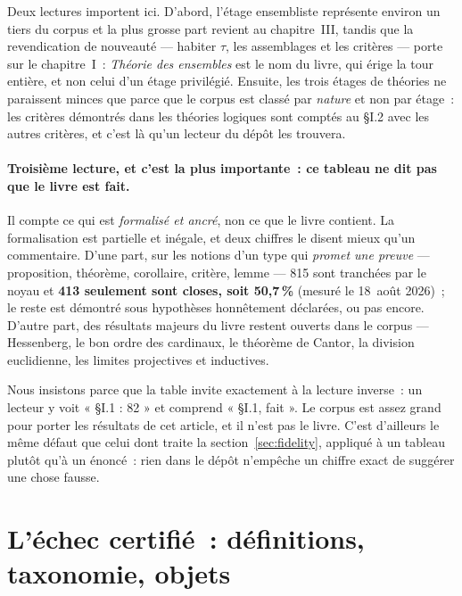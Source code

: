 \documentclass[11pt]{article}
\theoremstyle{remark}\newtheorem{example}{Exemple}
\begin{document}
Deux lectures importent ici. D'abord, l'étage ensembliste représente environ un tiers
du corpus et la plus grosse part revient au chapitre~III, tandis que la revendication
de nouveauté --- habiter $\tau$, les assemblages et les critères --- porte sur le
chapitre~I~: \emph{Théorie des ensembles} est le nom du livre, qui érige la tour
entière, et non celui d'un étage privilégié. Ensuite, les trois étages de théories ne
paraissent minces que parce que le corpus est classé par \emph{nature} et non par
étage~: les critères démontrés dans les théories logiques sont comptés au \S I.2 avec
les autres critères, et c'est là qu'un lecteur du dépôt les trouvera.

\paragraph{Troisième lecture, et c'est la plus importante~: ce tableau ne dit pas que le
livre est fait.} Il compte ce qui est \emph{formalisé et ancré}, non ce que le livre
contient. La formalisation est partielle et inégale, et deux chiffres le disent mieux
qu'un commentaire. D'une part, sur les notions d'un type qui \emph{promet une preuve}
--- proposition, théorème, corollaire, critère, lemme --- 815 sont tranchées par le
noyau et \textbf{413 seulement sont closes, soit 50,7\,\%} (mesuré le 18~août 2026)~; le
reste est démontré sous hypothèses honnêtement déclarées, ou pas encore. D'autre part,
des résultats majeurs du livre restent ouverts dans le corpus --- Hessenberg, le bon
ordre des cardinaux, le théorème de Cantor, la division euclidienne, les limites
projectives et inductives.

Nous insistons parce que la table invite exactement à la lecture inverse~: un lecteur y
voit « \S I.1 : 82 » et comprend « \S I.1, fait ». Le corpus est assez grand pour porter
les résultats de cet article, et il n'est pas le livre. C'est d'ailleurs le même défaut
que celui dont traite la section~\ref{sec:fidelity}, appliqué à un tableau plutôt qu'à
un énoncé~: rien dans le dépôt n'empêche un chiffre exact de suggérer une chose fausse.


\section{L'échec certifié~: définitions, taxonomie, objets}
\label{sec:certified-failure}
\end{document}
